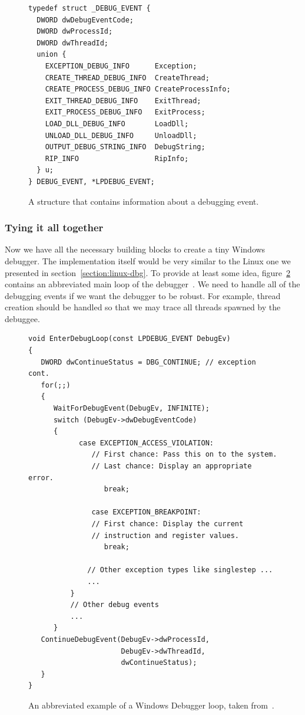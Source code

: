 \begin{figure}
\begin{verbatim}
typedef struct _DEBUG_EVENT {
  DWORD dwDebugEventCode;
  DWORD dwProcessId;
  DWORD dwThreadId;
  union {
    EXCEPTION_DEBUG_INFO      Exception;
    CREATE_THREAD_DEBUG_INFO  CreateThread;
    CREATE_PROCESS_DEBUG_INFO CreateProcessInfo;
    EXIT_THREAD_DEBUG_INFO    ExitThread;
    EXIT_PROCESS_DEBUG_INFO   ExitProcess;
    LOAD_DLL_DEBUG_INFO       LoadDll;
    UNLOAD_DLL_DEBUG_INFO     UnloadDll;
    OUTPUT_DEBUG_STRING_INFO  DebugString;
    RIP_INFO                  RipInfo;
  } u;
} DEBUG_EVENT, *LPDEBUG_EVENT;
\end{verbatim}
\caption{A structure that contains information about a debugging event.}
\label{fig:DebugEvent}
\end{figure}

\subsubsection*{Tying it all together}
Now we have all the necessary building blocks to create a tiny Windows
debugger. The implementation itself would be very similar to the Linux one we
presented in section~\ref{section:linux-dbg}. To provide at least some idea,
figure~\ref{fig:windows-debugger-mainloop} contains an abbreviated main loop of
the debugger~\cite{windows-msdn-dbg-main-loop}. We need to handle all of the
debugging events if we want the debugger to be robust. For example, thread
creation should be handled so that we may trace all threads spawned by the
debuggee.

\begin{figure}
    \begin{verbatim}
void EnterDebugLoop(const LPDEBUG_EVENT DebugEv)
{
   DWORD dwContinueStatus = DBG_CONTINUE; // exception cont.
   for(;;)
   {
      WaitForDebugEvent(DebugEv, INFINITE);
      switch (DebugEv->dwDebugEventCode)
      {
            case EXCEPTION_ACCESS_VIOLATION: 
               // First chance: Pass this on to the system.
               // Last chance: Display an appropriate error.
                  break;

               case EXCEPTION_BREAKPOINT:
               // First chance: Display the current
               // instruction and register values.
                  break;

              // Other exception types like singlestep ...
              ...
          }
          // Other debug events
          ...
      }
   ContinueDebugEvent(DebugEv->dwProcessId,
                      DebugEv->dwThreadId,
                      dwContinueStatus);
   }
}
    \end{verbatim}
    \caption{An abbreviated example of a Windows Debugger loop, taken
    from~\cite{windows-msdn-dbg-main-loop}.}
    \label{fig:windows-debugger-mainloop}
\end{figure}

